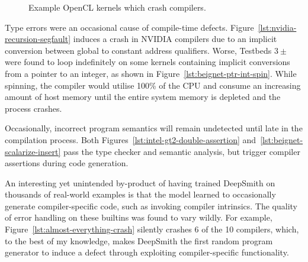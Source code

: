 
\begin{figure}
  \centering %
  \\%
  \\%
  \\%
  \\%
  \\%
  \caption[Example OpenCL kernels which crash compilers]{%
    Example OpenCL kernels which crash compilers.%
  }%
\end{figure}

Type errors were an occasional cause of compile-time defects. Figure~\ref{lst:nvidia-recursion-segfault} induces a crash in NVIDIA compilers due to an implicit conversion between global to constant address qualifiers. Worse, Testbeds $3\pm$ were found to loop indefinitely on some kernels containing implicit conversions from a pointer to an integer, as shown in Figure~\ref{lst:beignet-ptr-int-spin}. While spinning, the compiler would utilise 100\% of the CPU and consume an increasing amount of host memory until the entire system memory is depleted and the process crashes.

Occasionally, incorrect program semantics will remain undetected until late in the compilation process. Both Figures~\ref{lst:intel-gt2-double-assertion} and~\ref{lst:beignet-scalarize-insert} pass the type checker and semantic analysis, but trigger compiler assertions during code generation.

An interesting yet unintended by-product of having trained DeepSmith on thousands of real-world examples is that the model learned to occasionally generate compiler-specific code, such as invoking compiler intrinsics. The quality of error handling on these builtins was found to vary wildly. For example, Figure~\ref{lst:almost-everything-crash} silently crashes 6 of the 10 compilers, which, to the best of my knowledge, makes DeepSmith the first random program generator to induce a defect through exploiting compiler-specific functionality.

